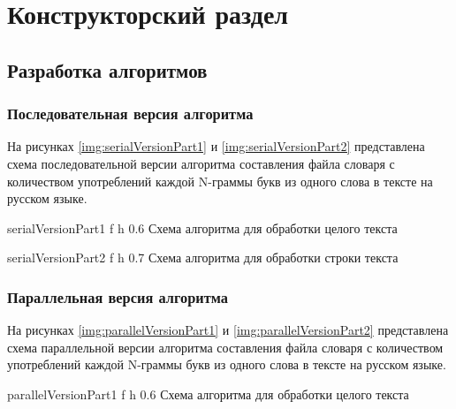\chapter{Конструкторский раздел}

\section{Разработка алгоритмов}

\subsection{Последовательная версия алгоритма}

На рисунках \ref{img:serialVersionPart1} и \ref{img:serialVersionPart2} представлена схема последовательной версии алгоритма составления файла словаря с количеством употреблений каждой N-граммы букв из одного слова в тексте на русском языке.

{serialVersionPart1} %
{f} %
{h} %
{0.6\textwidth} %
{Схема алгоритма для обработки целого текста} %

{serialVersionPart2} %
{f} %
{h} %
{0.7\textwidth} %
{Схема алгоритма для обработки строки текста} %

\clearpage

\subsection{Параллельная версия алгоритма}


На рисунках \ref{img:parallelVersionPart1} и \ref{img:parallelVersionPart2} представлена схема параллельной версии алгоритма составления файла словаря с количеством употреблений каждой N-граммы букв из одного слова в тексте на русском языке.

{parallelVersionPart1} %
{f} %
{h} %
{0.6\textwidth} %
{Схема алгоритма для обработки целого текста} %

